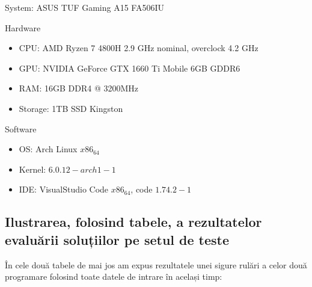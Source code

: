 \documentclass[runningheads]{llncs}
\begin{document}
System: ASUS TUF Gaming A15 FA506IU \newline

Hardware
\begin{itemize}
    \item CPU: AMD Ryzen 7 4800H 2.9 GHz nominal, overclock 4.2 GHz
    \item GPU: NVIDIA GeForce GTX 1660 Ti Mobile 6GB GDDR6
    \item RAM: 16GB DDR4 @ 3200MHz
    \item Storage: 1TB SSD Kingston
\end{itemize}

Software
\begin{itemize}
    \item OS: Arch Linux $x86_64$
    \item Kernel: $6.0.12-arch1-1$
    \item IDE: VisualStudio Code $x86_64$, code $1.74.2-1$
\end{itemize}

\subsection{Ilustrarea, folosind tabele, a rezultatelor evaluării soluțiilor pe setul de teste}

În cele două tabele de mai jos am expus rezultatele unei sigure rulări a celor două programare folosind toate datele de intrare în același timp:
\end{document}
